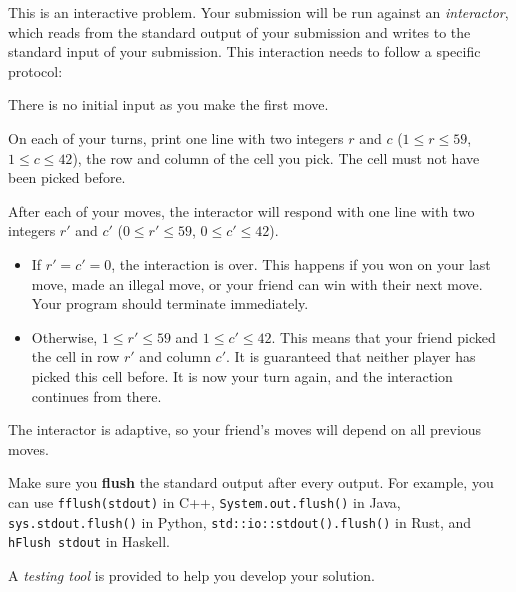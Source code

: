 
    This is an interactive problem.
    Your submission will be run against an \emph{interactor},
    which reads from the standard output of your submission
    and writes to the standard input of your submission.
    This interaction needs to follow a specific protocol:

    There is no initial input as you make the first move.

    On each of your turns, print one line with two integers $r$ and $c$
    ($1 \le r \le 59$, $1 \le c \le 42$),
    the row and column of the cell you pick.
    The cell must not have been picked before.

    After each of your moves, the interactor will respond with one line
    with two integers $r'$ and $c'$
    ($0 \le r' \le 59$, $0 \le c' \le 42$).
    \begin{itemize}
        \item If $r' = c' = 0$, the interaction is over.
            This happens if you won on your last move, made an illegal move,
            or your friend can win with their next move.
            Your program should terminate immediately.
        \item Otherwise, $1 \le r' \le 59$ and $1 \le c' \le 42$.
            This means that your friend picked the cell in row $r'$ and column $c'$.
            It is guaranteed that neither player has picked this cell before.
            It is now your turn again, and the interaction continues from there.
    \end{itemize}

    The interactor is adaptive, so
    your friend's moves will depend on all previous moves.

    Make sure you \textbf{flush} the standard output after every output.
    For example, you can use \texttt{fflush(stdout)} in C++,
    \texttt{System.out.flush()} in Java,
    \texttt{sys.stdout.flush()} in Python,
    \texttt{std::io::stdout().flush()} in Rust,
    and \texttt{hFlush stdout} in Haskell.

    A \emph{testing tool} is provided to help you develop your solution.
